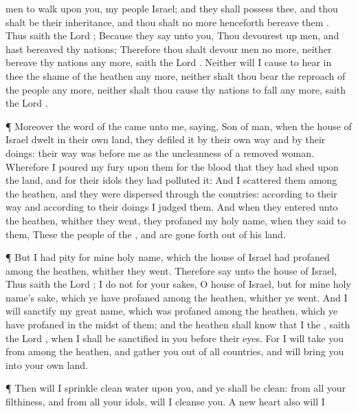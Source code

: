 {men to
walk upon you,
{} my
people
Israel; and they shall
possess thee, and thou shalt be their
inheritance, and thou shalt no
more henceforth
bereave them
{}.
Thus
saith the
Lord
{}; Because they
say unto you, Thou
{} devourest
up
men, and hast
bereaved thy
nations;
Therefore thou shalt
devour
men no more, neither
bereave thy
nations any more,
saith the
Lord
{}.
Neither will I cause
{} to
hear in thee the
shame of the
heathen any more, neither shalt thou
bear the
reproach of the
people any more, neither shalt thou cause thy
nations to
fall any more,
saith the
Lord
{}.
\par }{\PP {}¶ Moreover the
word of the
{} came unto me,
saying,
Son of
man, when the
house of
Israel
dwelt in their own
land, they
defiled it by their own
way and by their
doings: their
way was
before me as the
uncleanness of a removed
woman.
Wherefore I
poured my
fury upon them for the
blood that they had
shed upon the
land, and for their
idols
{} they had
polluted it:
And I
scattered them among the
heathen, and they were
dispersed through the
countries: according to their
way and according to their
doings I
judged them.
And when they
entered unto the
heathen, whither they
went, they
profaned my
holy
name, when they
said to them, These
{} the
people of the
{}, and are gone
forth out of his
land.
\par }{\PP {}¶ But I had
pity for mine
holy
name, which the
house of
Israel had
profaned among the
heathen, whither they
went.
Therefore
say unto the
house of
Israel, Thus
saith the
Lord
{}; I
do not
{} for your sakes, O
house of
Israel, but for mine
holy
name’s sake, which ye have
profaned among the
heathen, whither ye
went.
And I will
sanctify my
great
name, which was
profaned among the
heathen, which ye have
profaned in the
midst of them; and the
heathen shall
know that I
{} the
{},
saith the
Lord
{}, when I shall be
sanctified in you before their
eyes.
For I will
take you from
among the
heathen, and
gather you out of all
countries, and will
bring you into your own
land.
\par }{\PP {}¶ Then will I
sprinkle
clean
water upon you, and ye shall be
clean: from all your
filthiness, and from all your
idols, will I
cleanse you.
A
new
heart also will I
}
